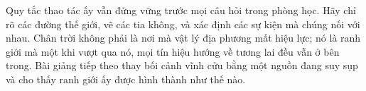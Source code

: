 \begin{classroomqa}
\end{classroomqa}

Quy tắc thao tác ấy vẫn đứng vững trước mọi câu hỏi trong phòng học. Hãy chỉ rõ các đường thế giới, vẽ các tia không, và xác định các sự kiện mà chúng nối với nhau. Chân trời không phải là nơi mà vật lý địa phương mất hiệu lực; nó là ranh giới mà một khi vượt qua nó, mọi tín hiệu hướng về tương lai đều vẫn ở bên trong. Bài giảng tiếp theo thay bối cảnh vĩnh cửu bằng một nguồn đang suy sụp và cho thấy ranh giới ấy được hình thành như thế nào.